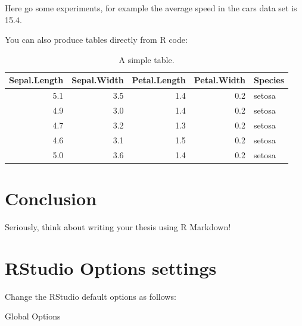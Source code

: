 \documentclass[
]{scrartcl}
\begin{document}
Here go some experiments, for example the average speed in the cars data set is 15.4.

You can also produce tables directly from R code:

\begin{longtable}[t]{rrrrl}
\caption{\label{tab:tables-mtcars}A simple table.}\\
\toprule
Sepal.Length & Sepal.Width & Petal.Length & Petal.Width & Species\\
\midrule
5.1 & 3.5 & 1.4 & 0.2 & setosa\\
4.9 & 3.0 & 1.4 & 0.2 & setosa\\
4.7 & 3.2 & 1.3 & 0.2 & setosa\\
4.6 & 3.1 & 1.5 & 0.2 & setosa\\
5.0 & 3.6 & 1.4 & 0.2 & setosa\\
\bottomrule
\end{longtable}

\hypertarget{sec:conclusion}{%
\section{Conclusion}\label{sec:conclusion}}

Seriously, think about writing your thesis using R Markdown!

\newpage


\hypertarget{appendix-appendix}{%
\appendix}


\hypertarget{sec:appA}{%
\section{RStudio Options settings}\label{sec:appA}}

Change the RStudio default options as follows:

Global Options
\end{document}
